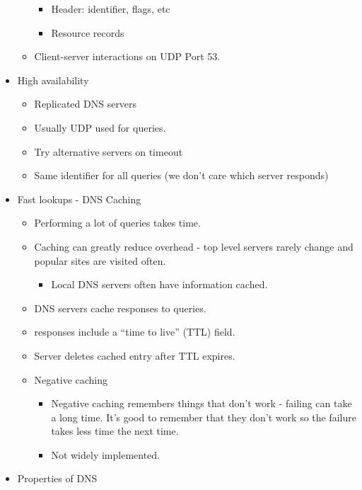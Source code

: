 \documentclass[]{article}
\providecommand{\tightlist}{%
  \setlength{\itemsep}{0pt}\setlength{\parskip}{0pt}}
\begin{document}
\begin{itemize}
\begin{itemize}
    \begin{itemize}
    \tightlist
    \item
      Header: identifier, flags, etc
    \item
      Resource records
    \end{itemize}
  \item
    Client-server interactions on UDP Port 53.
  \end{itemize}
\item
  High availability

  \begin{itemize}
  \tightlist
  \item
    Replicated DNS servers
  \item
    Usually UDP used for queries.
  \item
    Try alternative servers on timeout
  \item
    Same identifier for all queries (we don't care which server
    responds)
  \end{itemize}
\item
  Fast lookups - DNS Caching

  \begin{itemize}
  \tightlist
  \item
    Performing a lot of queries takes time.
  \item
    Caching can greatly reduce overhead - top level servers rarely
    change and popular sites are visited often.

    \begin{itemize}
    \tightlist
    \item
      Local DNS servers often have information cached.
    \end{itemize}
  \item
    DNS servers cache responses to queries.
  \item
    responses include a ``time to live'' (TTL) field.
  \item
    Server deletes cached entry after TTL expires.
  \item
    Negative caching

    \begin{itemize}
    \tightlist
    \item
      Negative caching remembers things that don't work - failing can
      take a long time. It's good to remember that they don't work so
      the failure takes less time the next time.
    \item
      Not widely implemented.
    \end{itemize}
  \end{itemize}
\item
  Properties of DNS


\end{itemize}
\end{document}

